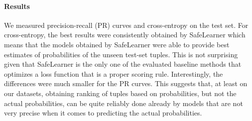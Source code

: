 \documentclass[akbc,twoside,11pt]{article}
\newcommand{\algorithmname}{SafeLearner\xspace}
\begin{document}
\paragraph{Results} We measured precision-recall (PR) curves and cross-entropy on the test set. For cross-entropy, the best results were consistently obtained by \algorithmname which means that the models obtained by \algorithmname were able to provide best estimates of probabilities of the unseen test-set tuples. This is not surprising given that \algorithmname is the only one of the evaluated baseline methods that optimizes a loss function that is a proper scoring rule. Interestingly, the differences were much smaller for the PR curves. This suggests that, at least on our datasets, obtaining ranking of tuples based on probabilities, but not the actual probabilities, can be quite reliably done already by models that are not very precise when it comes to predicting the actual probabilities.
\end{document}
